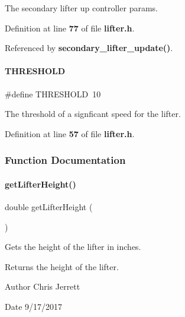 The secondary lifter up controller params. 



Definition at line \textbf{ 77} of file \textbf{ lifter.\+h}.



Referenced by \textbf{ secondary\+\_\+lifter\+\_\+update()}.

\mbox{\label{a00026_a4679d8ea8690999a6c6c7c0cb245c879}} 
\paragraph{T\+H\+R\+E\+S\+H\+O\+LD}
{\footnotesize\ttfamily \#define T\+H\+R\+E\+S\+H\+O\+LD~10}



The threshold of a signficant speed for the lifter. 



Definition at line \textbf{ 57} of file \textbf{ lifter.\+h}.



\subsubsection{Function Documentation}
\mbox{\label{a00026_a2719740958fd8a5926f88f6194e820e3}} 
\paragraph{get\+Lifter\+Height()}
{\footnotesize\ttfamily double get\+Lifter\+Height (\begin{DoxyParamCaption}{ }\end{DoxyParamCaption})}



Gets the height of the lifter in inches. 

\begin{DoxyReturn}{Returns}
the height of the lifter. 
\end{DoxyReturn}
\begin{DoxyAuthor}{Author}
Chris Jerrett 
\end{DoxyAuthor}
\begin{DoxyDate}{Date}
9/17/2017 
\end{DoxyDate}


